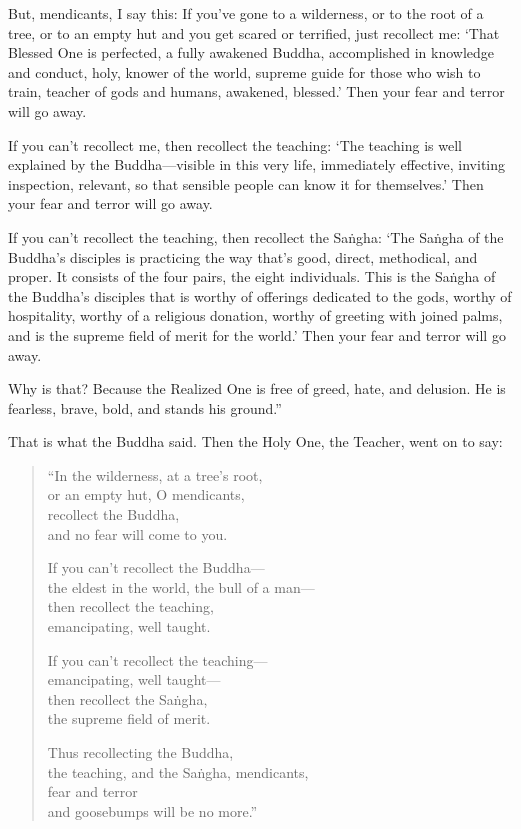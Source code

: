 \documentclass[12pt,openany]{book}%
\begin{document}
But, mendicants, I say this: If you’ve gone to a wilderness, or to the root of a tree, or to an empty hut and you get scared or terrified, just recollect me: ‘That Blessed One is perfected, a fully awakened Buddha, accomplished in knowledge and conduct, holy, knower of the world, supreme guide for those who wish to train, teacher of gods and humans, awakened, blessed.’ Then your fear and terror will go away. 

If you can’t recollect me, then recollect the teaching: ‘The teaching is well explained by the Buddha—visible in this very life, immediately effective, inviting inspection, relevant, so that sensible people can know it for themselves.’ Then your fear and terror will go away. 

If you can’t recollect the teaching, then recollect the \textsanskrit{Saṅgha}: ‘The \textsanskrit{Saṅgha} of the Buddha’s disciples is practicing the way that’s good, direct, methodical, and proper. It consists of the four pairs, the eight individuals. This is the \textsanskrit{Saṅgha} of the Buddha’s disciples that is worthy of offerings dedicated to the gods, worthy of hospitality, worthy of a religious donation, worthy of greeting with joined palms, and is the supreme field of merit for the world.’ Then your fear and terror will go away. 

Why is that? Because the Realized One is free of greed, hate, and delusion. He is fearless, brave, bold, and stands his ground.” 

That is what the Buddha said. Then the Holy One, the Teacher, went on to say: 

\begin{verse}%
“In the wilderness, at a tree’s root, \\
or an empty hut, O mendicants, \\
recollect the Buddha, \\
and no fear will come to you. 

If you can’t recollect the Buddha—\\
the eldest in the world, the bull of a man—\\
then recollect the teaching, \\
emancipating, well taught. 

If you can’t recollect the teaching—\\
emancipating, well taught—\\
then recollect the \textsanskrit{Saṅgha}, \\
the supreme field of merit. 

Thus recollecting the Buddha, \\
the teaching, and the \textsanskrit{Saṅgha}, mendicants, \\
fear and terror \\
and goosebumps will be no more.” 

%
\end{verse}
\end{document}
